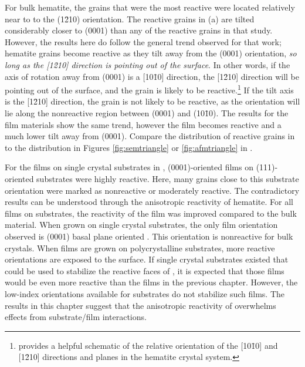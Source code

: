 For bulk hematite, the grains that were the most reactive were located relatively near to to the (1\={2}10) orientation. The reactive grains in (a) are tilted considerably closer to (0001) than any of the reactive grains in that study. However, the results here do follow the general trend observed for that work; hematite grains become reactive as they tilt away from the (0001) orientation, \emph{so long as the [1\={2}10] direction is pointing out of the surface}. In other words, if the axis of rotation away from (0001) is a [10\={1}0] direction, the [1\={2}10] direction will be pointing out of the surface, and the grain is likely to be reactive.\footnote{ provides a helpful schematic of the relative orientation of the [10\={1}0] and [1\={2}10] directions and planes in the hematite crystal system.} If the tilt axis is the [1\={2}10] direction, the grain is not likely to be reactive, as the orientation will lie along the nonreactive region between (0001) and (10\={1}0). The results for the film materials show the same trend, however the film becomes reactive and a much lower tilt away from (0001). Compare the distribution of reactive grains in  to the distribution in Figures \ref{fig:semtriangle} or \ref{fig:afmtriangle} in .

For the films on single crystal substrates in , (0001)-oriented films on (111)-oriented substrates were highly reactive. Here, many grains close to this substrate orientation were marked as nonreactive or moderately reactive. The contradictory results can be understood through the anisotropic reactivity of hematite. For all  films on  substrates, the reactivity of the film was improved compared to the bulk material. When grown on single crystal substrates, the only film orientation observed is (0001)  basal plane oriented . This orientation is nonreactive for bulk crystals. When films are grown on polycrystalline substrates, more reactive  orientations are exposed to the surface. If single crystal substrates existed that could be used to stabilize the reactive faces of , it is expected that those films would be even more reactive than the films in the previous chapter. However, the low-index orientations available for  substrates do not stabilize such films. The results in this chapter suggest that the anisotropic reactivity of  overwhelms effects from substrate/film interactions.

